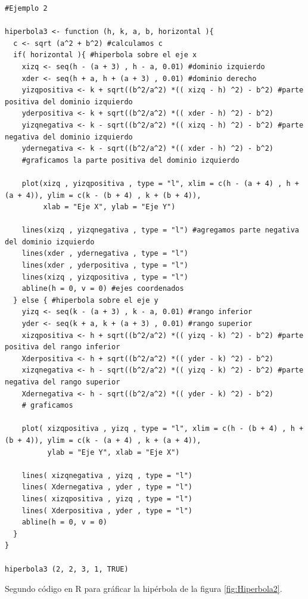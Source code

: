 \documentclass[12pt,a4paper]{article} %
\begin{document}
\begin{table}[htpb]
	\begin{lstlisting}
#Ejemplo 2

hiperbola3 <- function (h, k, a, b, horizontal ){
  c <- sqrt (a^2 + b^2) #calculamos c
  if( horizontal ){ #hiperbola sobre el eje x
    xizq <- seq(h - (a + 3) , h - a, 0.01) #dominio izquierdo
    xder <- seq(h + a, h + (a + 3) , 0.01) #dominio derecho
    yizqpositiva <- k + sqrt((b^2/a^2) *(( xizq - h) ^2) - b^2) #parte positiva del dominio izquierdo
    yderpositiva <- k + sqrt((b^2/a^2) *(( xder - h) ^2) - b^2)
    yizqnegativa <- k - sqrt((b^2/a^2) *(( xizq - h) ^2) - b^2) #parte negativa del dominio izquierdo
    ydernegativa <- k - sqrt((b^2/a^2) *(( xder - h) ^2) - b^2)
    #graficamos la parte positiva del dominio izquierdo
    
    plot(xizq , yizqpositiva , type = "l", xlim = c(h - (a + 4) , h + (a + 4)), ylim = c(k - (b + 4) , k + (b + 4)),
         xlab = "Eje X", ylab = "Eje Y")
    
    lines(xizq , yizqnegativa , type = "l") #agregamos parte negativa del dominio izquierdo
    lines(xder , ydernegativa , type = "l")
    lines(xder , yderpositiva , type = "l")
    lines(xizq , yizqpositiva , type = "l")
    abline(h = 0, v = 0) #ejes coordenados
  } else { #hiperbola sobre el eje y
    yizq <- seq(k - (a + 3) , k - a, 0.01) #rango inferior
    yder <- seq(k + a, k + (a + 3) , 0.01) #rango superior
    xizqpositiva <- h + sqrt((b^2/a^2) *(( yizq - k) ^2) - b^2) #parte positiva del rango inferior
    Xderpositiva <- h + sqrt((b^2/a^2) *(( yder - k) ^2) - b^2) 
    xizqnegativa <- h - sqrt((b^2/a^2) *(( yizq - k) ^2) - b^2) #parte negativa del rango superior
    Xdernegativa <- h - sqrt((b^2/a^2) *(( yder - k) ^2) - b^2)
    # graficamos
    
    plot( xizqpositiva , yizq , type = "l", xlim = c(h - (b + 4) , h + (b + 4)), ylim = c(k - (a + 4) , k + (a + 4)),
          ylab = "Eje Y", xlab = "Eje X")
    
    lines( xizqnegativa , yizq , type = "l")
    lines( Xdernegativa , yder , type = "l")
    lines( xizqpositiva , yizq , type = "l")
    lines( Xderpositiva , yder , type = "l")
    abline(h = 0, v = 0)
  }
}

hiperbola3 (2, 2, 3, 1, TRUE)

	\end{lstlisting}
	\caption{Segundo código en R para gráficar la hipérbola de la figura \ref{fig:Hiperbola2}.}
\label{alg:Hiperbola2}	
\end{table}
\end{document}
